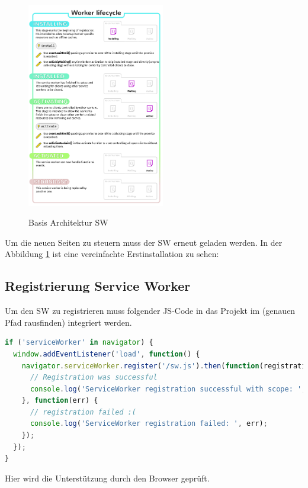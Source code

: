 \begin{figure}[h]
	\centering
	\includegraphics[width=6cm]{BilderAllgemein/swLifecycle}\medskip
	\caption{Basis Architektur \acl{SW}}
	\label{fig:Erstinstallation}\cite{ServiceWorkerArchitecture}
\end{figure}
Um die neuen Seiten zu steuern muss der \acs{SW} erneut geladen werden.
In der Abbildung \ref{fig:Erstinstallation} ist eine vereinfachte Erstinstallation zu sehen:

\newpage
\subsection{Registrierung Service Worker}\label{chap:RegistrierungServiceWorker}

Um den \acs{SW} zu registrieren muss folgender \acs{JS}-Code in das Projekt im (genauen Pfad rausfinden) integriert werden.
\begin{lstlisting}[language=JavaScript, caption={Service Worker Register},label=lst:ServiceWorkerRegister, xleftmargin=50pt]
if ('serviceWorker' in navigator) {
  window.addEventListener('load', function() {
    navigator.serviceWorker.register('/sw.js').then(function(registration) {
      // Registration was successful
      console.log('ServiceWorker registration successful with scope: ', registration.scope);
    }, function(err) {
      // registration failed :(
      console.log('ServiceWorker registration failed: ', err);
    });
  });
}
\end{lstlisting}

Hier wird die Unterstützung durch den Browser geprüft.


